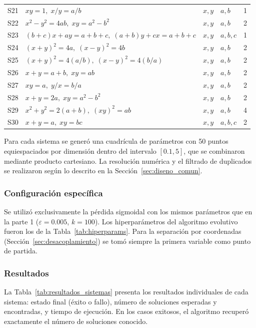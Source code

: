 \documentclass[12pt,a4paper]{article} \usepackage[utf8]{inputenc} \usepackage[spanish]{babel} \usepackage{amsmath, amssymb, amsthm} \usepackage{bm} \usepackage{float} \usepackage{longtable} \usepackage[hidelinks]{hyperref}
\begin{document}
\begin{longtable}{clllc}
S21 & $x y = 1,\; x/y = a/b$ & $x,y$ & $a,b$ & 1 \\
S22 & $x^2 - y^2 = 4ab,\; x y = a^2 - b^2$ & $x,y$ & $a,b$ & 2 \\
S23 & $(b+c)x + a y = a+b+c,\; (a+b)y + c x = a+b+c$ & $x,y$ & $a,b,c$ & 1 \\
S24 & $(x+y)^2 = 4a,\; (x-y)^2 = 4b$ & $x,y$ & $a,b$ & 2 \\
S25 & $(x+y)^2 = 4(a/b),\; (x-y)^2 = 4(b/a)$ & $x,y$ & $a,b$ & 2 \\
S26 & $x + y = a + b,\; x y = a b$ & $x,y$ & $a,b$ & 2 \\
S27 & $x y = a,\; y/x = b/a$ & $x,y$ & $a,b$ & 2 \\
S28 & $x + y = 2a,\; x y = a^2 - b^2$ & $x,y$ & $a,b$ & 2 \\
S29 & $x^2 + y^2 = 2(a+b),\; (x y)^2 = a b$ & $x,y$ & $a,b$ & 4 \\
S30 & $x + y = a,\; x y = b c$ & $x,y$ & $a,b,c$ & 2 \\
\end{longtable}

Para cada sistema se generó una cuadrícula de parámetros con 50 puntos equiespaciados por dimensión dentro del intervalo $[0.1, 5]$, que se combinaron mediante producto cartesiano. La resolución numérica y el filtrado de duplicados se realizaron según lo descrito en la Sección~\ref{sec:diseno_comun}.

\subsubsection{Configuración específica}

Se utilizó exclusivamente la pérdida sigmoidal con los mismos parámetros que en la parte 1 ($\varepsilon = 0.005$, $k = 100$). Los hiperparámetros del algoritmo evolutivo fueron los de la Tabla~\ref{tab:hiperparams}. Para la separación por coordenadas (Sección~\ref{sec:desacoplamiento}) se tomó siempre la primera variable como punto de partida.

\subsubsection{Resultados}

La Tabla~\ref{tab:resultados_sistemas} presenta los resultados individuales de cada sistema: estado final (éxito o fallo), número de soluciones esperadas y encontradas, y tiempo de ejecución. En los casos exitosos, el algoritmo recuperó exactamente el número de soluciones conocido.
\end{document}
